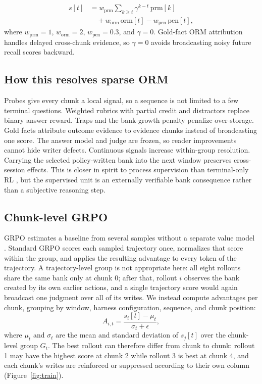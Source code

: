 \documentclass{article}
\begin{document}
\begin{align}
s[t] &= w_{\mathrm{prm}}\sum_{k\ge t}\gamma^{k-t}\,\mathrm{prm}[k] \nonumber \\
&\quad + w_{\mathrm{orm}}\,\mathrm{orm}[t]
- w_{\mathrm{pen}}\,\mathrm{pen}[t],
\end{align}
where $w_{\mathrm{prm}}=1$, $w_{\mathrm{orm}}=2$, $w_{\mathrm{pen}}=0.3$, and $\gamma=0$. Gold-fact ORM attribution handles delayed cross-chunk evidence, so $\gamma=0$ avoids broadcasting noisy future recall scores backward.

\subsection{How this resolves sparse ORM}

Probes give every chunk a local signal, so a sequence is not limited to a few terminal questions. Weighted rubrics with partial credit and distractors replace binary answer reward. Traps and the bank-growth penalty penalize over-storage. Gold facts attribute outcome evidence to evidence chunks instead of broadcasting one score. The answer model and judge are frozen, so reader improvements cannot hide writer defects. Continuous signals increase within-group resolution. Carrying the selected policy-written bank into the next window preserves cross-session effects. This is closer in spirit to process supervision than terminal-only RL \citep{lightman}, but the supervised unit is an externally verifiable bank consequence rather than a subjective reasoning step.

\subsection{Chunk-level GRPO}

GRPO estimates a baseline from several samples without a separate value model \citep{grpo}. Standard GRPO scores each sampled trajectory once, normalizes that score within the group, and applies the resulting advantage to every token of the trajectory. A trajectory-level group is not appropriate here: all eight rollouts share the same bank only at chunk 0; after that, rollout $i$ observes the bank created by its own earlier actions, and a single trajectory score would again broadcast one judgment over all of its writes. We instead compute advantages per chunk, grouping by window, harness configuration, sequence, and chunk position:
\begin{equation}
A_{i,t}
=\frac{s_i[t]-\mu_t}{\sigma_t+\epsilon},
\end{equation}
where $\mu_t$ and $\sigma_t$ are the mean and standard deviation of $s_j[t]$ over the chunk-level group $G_t$.
The best rollout can therefore differ from chunk to chunk: rollout 1 may have the highest score at chunk 2 while rollout 3 is best at chunk 4, and each chunk's writes are reinforced or suppressed according to their own column (Figure~\ref{fig:train}).
\end{document}
